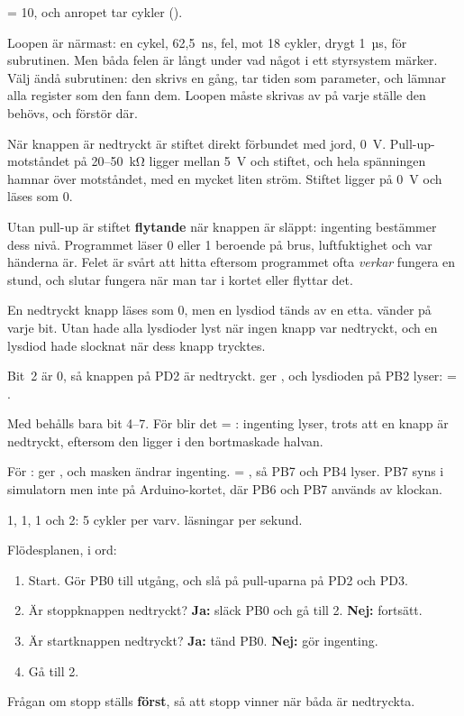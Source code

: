  = 10, och anropet tar \mbox{} cykler
().

Loopen är närmast: en cykel, 62,5~ns, fel, mot 18 cykler, drygt 1~µs, för subrutinen. Men
båda felen är långt under vad något i ett styrsystem märker. Välj ändå subrutinen: den skrivs en
gång, tar tiden som parameter, och lämnar alla register som den fann dem. Loopen måste skrivas av
på varje ställe den behövs, och förstör  där.

När knappen är nedtryckt är stiftet direkt förbundet med jord, 0~V. Pull-up-motståndet på
20--50~kΩ ligger mellan 5~V och stiftet, och hela spänningen hamnar över motståndet, med en mycket
liten ström. Stiftet ligger på 0~V och läses som 0.

Utan pull-up är stiftet \textbf{flytande} när knappen är släppt: ingenting bestämmer dess
nivå. Programmet läser 0 eller 1 beroende på brus, luftfuktighet och var händerna är. Felet är
svårt att hitta eftersom programmet ofta \emph{verkar} fungera en stund, och slutar fungera när man
tar i kortet eller flyttar det.

En nedtryckt knapp läses som 0, men en lysdiod tänds av en etta.  vänder på varje
bit. Utan  hade alla lysdioder lyst när ingen knapp var nedtryckt, och en lysdiod hade
slocknat när dess knapp trycktes.

Bit~2 är 0, så knappen på PD2 är nedtryckt.  ger , och lysdioden
på PB2 lyser:  = .

Med  behålls bara bit 4--7. För  blir det
 = : ingenting lyser, trots att en knapp är nedtryckt,
eftersom den ligger i den bortmaskade halvan.

För :  ger , och masken ändrar ingenting.
 = , så PB7 och PB4 lyser. PB7 syns i simulatorn men inte på
Arduino-kortet, där PB6 och PB7 används av klockan.

 1,  1,  1 och  2: 5 cykler per varv.
\mbox{} läsningar per sekund.

Flödesplanen, i ord:
\begin{enumerate}
  \item Start. Gör PB0 till utgång, och slå på pull-uparna på PD2 och PD3.
  \item Är stoppknappen nedtryckt? \textbf{Ja:} släck PB0 och gå till 2. \textbf{Nej:} fortsätt.
  \item Är startknappen nedtryckt? \textbf{Ja:} tänd PB0. \textbf{Nej:} gör ingenting.
  \item Gå till 2.
\end{enumerate}
Frågan om stopp ställs \textbf{först}, så att stopp vinner när båda är nedtryckta.

